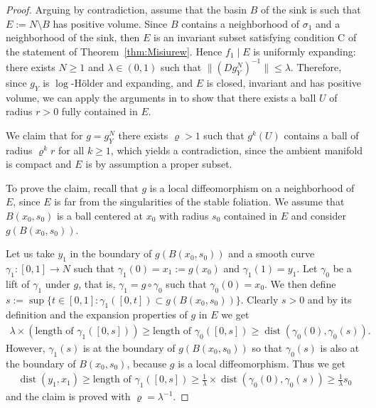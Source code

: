 \documentclass[reqno,12pt,a4paper]{amsart}
\theoremstyle{plain}
\theoremstyle{definition}
\begin{document}
\begin{proof}
  Arguing by contradiction, assume that the basin $B$ of the
  sink is such that $E:=N\setminus B$ has positive
  volume. Since $B$ contains a neighborhood of $\sigma_1$
  and a neighborhood of the sink, then $E$ is an invariant
  subset satisfying condition C of the statement of
  Theorem~\ref{thm:Misiurew}. Hence $f_1\mid E$ is uniformly
  expanding: there exists $N\ge1$ and $\lambda\in(0,1)$ such
  that $\|(Dg_Y^N)^{-1}\|\le\lambda$. Therefore, since $g_Y$
  is $\log$-H\"older and expanding, and $E$ is closed,
  invariant and has positive volume, we can apply the
  arguments in \cite{AAPP} to show that there exists a ball
  $U$ of radius $r>0$ fully contained in $E$.

  We claim that for $g=g_Y^N$ there exists ${\varrho}>1$ such
  that $g^k(U)$ contains a ball of radius ${\varrho}^k r$ for all
  $k\ge1$, which yields a contradiction, since the ambient
  manifold is compact and $E$ is by assumption a proper
  subset.

  To prove the claim, recall that $g$ is a local
  diffeomorphism on a neighborhood of $E$, since $E$ is far
  from the singularities of the stable foliation. We assume
  that $B(x_0,s_0)$ is a ball centered at $x_0$ with radius
  $s_0$ contained in $E$ and consider $g(B(x_0,s_0))$.

  Let us take $y_1$ in the boundary of $g(B(x_0,s_0))$ and a
  smooth curve $\gamma_1:[0,1]\to N$ such that
  $\gamma_1(0)=x_1:=g(x_0)$ and $\gamma_1(1)=y_1$.  Let
  $\gamma_0$ be a lift of $\gamma_1$ under $g$, that is,
  $\gamma_1=g\circ\gamma_0$ such that $\gamma_0(0)=x_0$.  We
  then define $s:=\sup\{ t\in[0,1] : \gamma_1([0,t])\subset
  g(B(x_0,s_0)) \}.$ Clearly $s>0$ and by its definition and
  the expansion properties of $g$ in $E$ we get
  \begin{align*}
    \lambda \times (\text{length of  } \gamma_1([0,s]))
    \ge \text{length of  } \gamma_0([0,s]) \ge
    {\operatorname{dist}}(\gamma_0(0),\gamma_0 (s)).
  \end{align*}
  However, $\gamma_1(s)$ is at the boundary of
  $g(B(x_0,s_0))$ so that $\gamma_0(s)$ is also at the
  boundary of $B(x_0,s_0)$, because $g$ is a local
  diffeomorphism. Thus we get
  \begin{align*}
    {\operatorname{dist}}(y_1,x_1)\ge \text{length of } \gamma_1([0,s]) \ge
    \frac1\lambda\times {\operatorname{dist}}(\gamma_0(0),\gamma_0 (s)) \ge
    \frac1\lambda s_0
  \end{align*}
  and the claim is proved with ${\varrho}=\lambda^{-1}$.
\end{proof}
\end{document}
